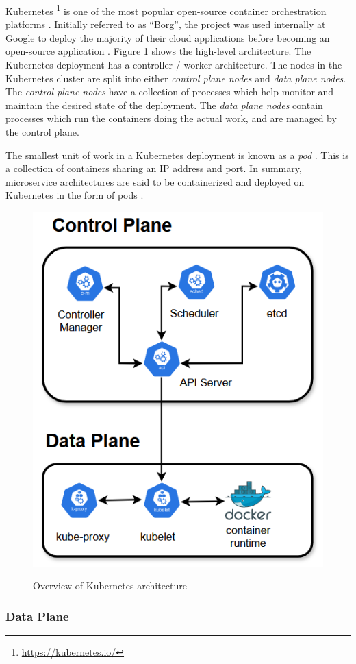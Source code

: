 Kubernetes \footnote{\url{https://kubernetes.io/}} is one of the most popular open-source container orchestration platforms \cite{vayghan2019kubernetes}. Initially referred to as ``Borg'', the project was used internally at Google to deploy the majority of their cloud applications before becoming an open-source application \cite{burns2016borg}. Figure \ref{fig:k8s-arch} shows the high-level architecture. The Kubernetes deployment has a controller / worker architecture. The nodes in the Kubernetes cluster are split into either \textit{control plane nodes} and \textit{data plane nodes}. The \textit{control plane nodes} have a collection of processes which help monitor and maintain the desired state of the deployment. The \textit{data plane nodes} contain processes which run the containers doing the actual work, and are managed by the control plane.\par
The smallest unit of work in a Kubernetes deployment is known as a \textit{pod} \cite{baier2017getting}. This is a collection of containers sharing an IP address and port. In summary, microservice architectures are said to be containerized and deployed on Kubernetes in the form of pods \cite{vayghan2019kubernetes}.\par
\begin{figure}[htb]
    \centering
    \caption{Overview of Kubernetes architecture}
    \includegraphics[width=0.5\linewidth]{Figures/K8s-Architecture.png}
    \label{fig:k8s-arch}
\end{figure}

\subsubsection{Data Plane}
\label{subsubsec:k8s-data-plane}

